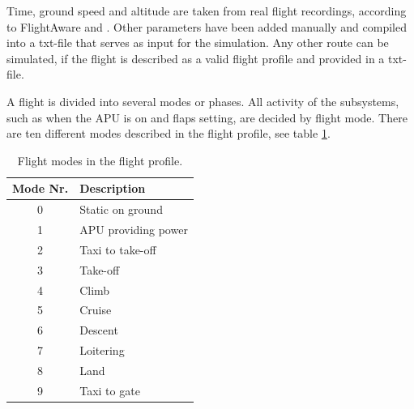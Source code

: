 \documentclass[english]{kththesis}
\begin{document}
Time, ground speed and altitude are taken from real flight recordings, according to FlightAware \cite{flightaware} and \cite{flightaware2}. Other parameters have been added manually and compiled into a txt-file that serves as input for the simulation. Any other route can be simulated, if the flight is described as a valid flight profile and provided in a txt-file.

A flight is divided into several modes or phases. All activity of the subsystems, such as when the APU is on and flaps setting, are decided by flight mode. There are ten different modes described in the flight profile, see table \ref{table:FlightModes}.

\begin{table}[h!]
\centering
\caption{Flight modes in the flight profile.}
\begin{tabular}{ c | l }
 Mode Nr. & Description \\ 
 \hline
 \hline
 0 & Static on ground\\  
 1 & APU providing power \\
 2 & Taxi to take-off \\
 3 & Take-off \\
 4 & Climb \\
 5 & Cruise \\
 6 & Descent \\
 7 & Loitering \\
 8 & Land \\
 9 & Taxi to gate\\
\end{tabular}
\label{table:FlightModes}
\end{table}
\end{document}
